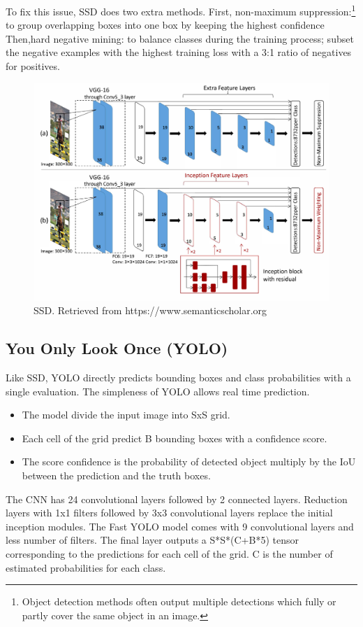 \documentclass[12pt]{report}
\begin{document}
To fix this issue, SSD does two extra methods.
First, non-maximum suppression:\footnote{Object detection methods often output multiple detections which fully or partly cover the same object in an image.}
to group overlapping boxes into one box by keeping the highest confidence
Then,hard negative mining: to balance classes during the training process; subset the negative examples 
with the highest training loss with a 3:1 ratio of negatives for positives.\cite{Liu2016}

\begin{figure}[h]
    \centering
    \includegraphics[width=.8\textwidth]{./images/ssd.png}
    \caption{SSD. Retrieved from https://www.semanticscholar.org}
    \label{fig:frcnn}
\end{figure} 



\subsection{You Only Look Once (YOLO)}

Like SSD, YOLO directly predicts bounding boxes and class probabilities
with a single evaluation. The simpleness of YOLO allows real time prediction.
\begin{itemize}
    \item The model divide the input image into SxS grid.
    \item Each cell of the grid predict B bounding boxes with a confidence score.
    \item The score confidence is the probability of detected object multiply by the IoU between the prediction and the truth boxes.
\end{itemize}
The CNN has 24 convolutional layers followed by 2 connected layers.
Reduction layers with 1x1 filters followed by 3x3 convolutional layers 
replace the initial inception modules.
\bigbreak
The Fast YOLO model comes with 9  convolutional layers and less number of filters.
The final layer outputs a S*S*(C+B*5) tensor corresponding to the predictions for each cell of the grid.
C is the number of estimated probabilities for each class.
\end{document}
